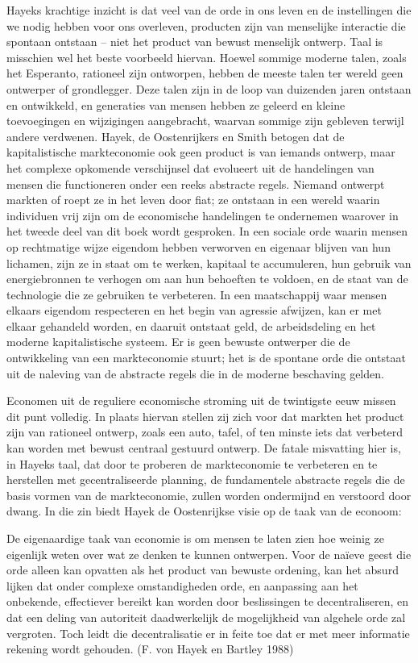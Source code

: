 \documentclass[
  a5paper,
  smalldemyvopaper,11pt,twoside,onecolumn,openright,extrafontsizes,
hidelinks]{memoir}
\begin{document}
Hayeks krachtige inzicht is dat veel van de orde in ons leven en de
instellingen die we nodig hebben voor ons overleven, producten zijn van
menselijke interactie die spontaan ontstaan -- niet het product van
bewust menselijk ontwerp. Taal is misschien wel het beste voorbeeld
hiervan. Hoewel sommige moderne talen, zoals het Esperanto, rationeel
zijn ontworpen, hebben de meeste talen ter wereld geen ontwerper of
grondlegger. Deze talen zijn in de loop van duizenden jaren ontstaan en
ontwikkeld, en generaties van mensen hebben ze geleerd en kleine
toevoegingen en wijzigingen aangebracht, waarvan sommige zijn gebleven
terwijl andere verdwenen. Hayek, de Oostenrijkers en Smith betogen dat
de kapitalistische markteconomie ook geen product is van iemands
ontwerp, maar het complexe opkomende verschijnsel dat evolueert uit de
handelingen van mensen die functioneren onder een reeks abstracte
regels. Niemand ontwerpt markten of roept ze in het leven door fiat; ze
ontstaan in een wereld waarin individuen vrij zijn om de economische
handelingen te ondernemen waarover in het tweede deel van dit boek wordt
gesproken. In een sociale orde waarin mensen op rechtmatige wijze
eigendom hebben verworven en eigenaar blijven van hun lichamen, zijn ze
in staat om te werken, kapitaal te accumuleren, hun gebruik van
energiebronnen te verhogen om aan hun behoeften te voldoen, en de staat
van de technologie die ze gebruiken te verbeteren. In een maatschappij
waar mensen elkaars eigendom respecteren en het begin van agressie
afwijzen, kan er met elkaar gehandeld worden, en daaruit ontstaat geld,
de arbeidsdeling en het moderne kapitalistische systeem. Er is geen
bewuste ontwerper die de ontwikkeling van een markteconomie stuurt; het
is de spontane orde die ontstaat uit de naleving van de abstracte regels
die in de moderne beschaving gelden.

Economen uit de reguliere economische stroming uit de twintigste eeuw
missen dit punt volledig. In plaats hiervan stellen zij zich voor dat
markten het product zijn van rationeel ontwerp, zoals een auto, tafel,
of ten minste iets dat verbeterd kan worden met bewust centraal gestuurd
ontwerp. De fatale misvatting hier is, in Hayeks taal, dat door te
proberen de markteconomie te verbeteren en te herstellen met
gecentraliseerde planning, de fundamentele abstracte regels die de basis
vormen van de markteconomie, zullen worden ondermijnd en verstoord door
dwang. In die zin biedt Hayek de Oostenrijkse visie op de taak van de
econoom:

De eigenaardige taak van economie is om mensen te laten zien hoe weinig
ze eigenlijk weten over wat ze denken te kunnen ontwerpen. Voor de
naïeve geest die orde alleen kan opvatten als het product van bewuste
ordening, kan het absurd lijken dat onder complexe omstandigheden orde,
en aanpassing aan het onbekende, effectiever bereikt kan worden door
beslissingen te decentraliseren, en dat een deling van autoriteit
daadwerkelijk de mogelijkheid van algehele orde zal vergroten. Toch
leidt die decentralisatie er in feite toe dat er met meer informatie
rekening wordt gehouden. (F. von Hayek en Bartley 1988)
\end{document}
